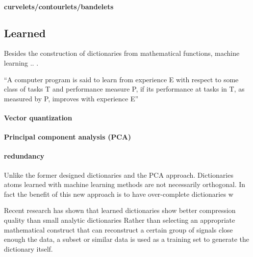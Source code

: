 \paragraph{curvelets/contourlets/bandelets}


\subsection{Learned}


Besides the construction of dictionaries from mathematical functions, machine
learning .. .


``A computer program is said to learn from experience E with respect to
some class of tasks T and performance measure P, if its performance at tasks in
T, as measured by P, improves with experience E''


\paragraph{Vector quantization}

\paragraph{Principal component analysis (PCA)}


\paragraph{redundancy}
Unlike the former designed dictionaries and the PCA approach. Dictionaries atoms
learned with machine learning methods are not necessarily orthogonal. In fact
the benefit of this new approach is to have over-complete dictionaries w



Recent research has shown that learned dictionaries show better
compression quality than small analytic dictionaries\cite{Chen1998}
\cite{Aharon2006} \cite{Mairal2010} Rather than selecting an appropriate
mathematical construct that can reconstruct a certain group of signals close
enough the data, a subset or similar data is used as a training set to generate
the dictionary itself.





